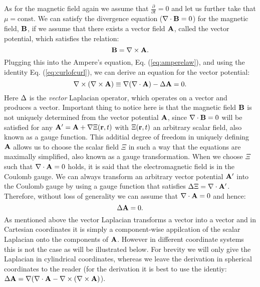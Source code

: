\documentclass[11pt,a4paper]{report}
\def\Nabla{\ensuremath\bm{\nabla}}
\def\bm{\ensuremath\mathbf}
\def\curl{\ensuremath\Nabla\times}
\def\div{\ensuremath\Nabla\cdot}
\def\lap{\ensuremath\Delta}
\def\vlap{\ensuremath\Delta}
\begin{document}
As for the magnetic field again we assume that $ \frac{\partial}{\partial t} = 0 $ and let us further take that $\mu = \text{const}$. We can satisfy the divergence equation ($\div \bm{B} = 0 $) for the magnetic field, $\bm{B}$, if we assume that there exists a vector field $\bm{A}$, called the vector potential, which satisfies the relation: 
\begin{equation*}
  \bm{B} = \curl \bm{A}.
\end{equation*}
Plugging this into the Ampere's equation, Eq. (\ref{eq:amperelaw}), and using the identity Eq. (\ref{eq:curlofcurl}), we can derive an equation for the vector potential: 
\begin{equation*}
  \curl (\curl \bm{A}) \equiv \Nabla(\div \bm{A})-\vlap{\bm{A}} = 0.
\end{equation*}
Here $\vlap$ is the \emph{vector} Laplacian operator, which operates on a vector and produces a vector. Important thing to notice here is that the magnetic field $\bm{B}$ is not uniquely determined from the vector potential $\bm{A}$, since $\div{\bm{B}}=0$ will be satisfied for any $\bm{A'} = \bm{A}+\Nabla{\Xi(\bm{r},t)}$ with $\Xi(\bm{r},t)$ an arbitrary scalar field, also known as a gauge function. This additial degree of freedom in uniquely defining $\bm{A}$ allows us to choose the scalar field $\Xi$ in such a way that the equations are maximally simplified, also known as a gauge transformation. When we choose $\Xi$ such that $\div \bm{A} = 0 $ holds, it is said that the electromagnetic field is in the Coulomb gauge. We can always transform an arbitrary vector potential $\bm{A'}$ into the Coulomb gauge by using a gauge function that satisfies $\lap \Xi = \div \bm{A'}$. Therefore, without loss of generality we can assume that $\div {\bm{A}= 0 }$ and hence:
\begin{equation*}
  \vlap \bm{A} = 0.
\end{equation*}
As mentioned above the vector Laplacian transforms a vector into a vector and in Cartesian coordinates it is simply a component-wise appilcation of the scalar Laplacian onto the components of $\bm{A}$. However in different coordinate systems this is not the case as will be illustrated below. For brevity we will only give the Laplacian in cylindrical coordinates, whereas we leave the derivation in spherical coordinates to the reader (for the derivation it is best to use the identiy: $\vlap \bm{A} = \Nabla (\div{\bm{A}}-\curl(\curl \bm{A})$).
\end{document}
